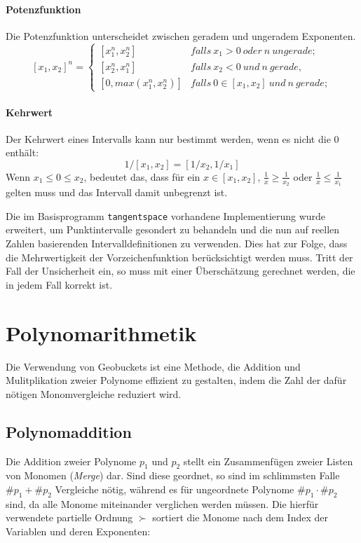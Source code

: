 \paragraph{Potenzfunktion}\label{par:potenzfunktion}
Die Potenzfunktion unterscheidet zwischen geradem und ungeradem Exponenten.
$$[x_1, x_2]^n =
 \begin{cases}
    [x_1^n, x_2^n] & falls\ x_1 > 0\ oder\ n\ ungerade; \\
    [x_2^n, x_1^n] & falls\ x_2 < 0\ und\ n\ gerade, \\
    [0, max(x_1^n, x_2^n)] & falls\ 0\in [x_1, x_2] \ und\ n\ gerade;
 \end{cases}$$

\paragraph{Kehrwert}
Der Kehrwert eines Intervalls kann nur bestimmt werden, wenn es nicht die 0 enthält:
$$
1/[x_1, x_2] = [1/x_2, 1/x_1]
$$
Wenn $x_1 \leq 0\leq x_2$, bedeutet das, dass für ein $x\in [x_1, x_2]$, $\frac{1}{x} \geq \frac{1}{x_2}$ oder $\frac{1}{x} \leq \frac{1}{x_1}$ gelten muss und das Intervall damit unbegrenzt ist.


Die im Basisprogramm \verb+tangentspace+ vorhandene Implementierung wurde erweitert, um Punktintervalle gesondert zu behandeln und die nun auf reellen Zahlen basierenden Intervalldefinitionen zu verwenden. Dies hat zur Folge, dass die Mehrwertigkeit der Vorzeichenfunktion berücksichtigt werden muss. Tritt der Fall der Unsicherheit ein, so muss mit einer Überschätzung gerechnet werden, die in jedem Fall korrekt ist.




\section{Polynomarithmetik}
\label{ch:Implementierung:sec:Abschnitt1}

Die Verwendung von Geobuckets ist eine Methode, die Addition \cite{geobuckets} und Mulitplikation \cite{geobucketsmulti} zweier Polynome effizient zu gestalten, indem die Zahl der dafür nötigen Monomvergleiche reduziert wird.

\subsection{Polynomaddition}
Die Addition zweier Polynome $p_1$ und $p_2$ stellt ein Zusammenfügen zweier Listen von Monomen (\textit{Merge}) dar. Sind diese geordnet, so sind im schlimmsten Falle $\#p_1 +\#p_2$ Vergleiche nötig, während es für ungeordnete Polynome $\#p_1 \cdot \#p_2$ sind, da alle Monome miteinander verglichen werden müssen. Die hierfür verwendete partielle Ordnung $\succ$ sortiert die Monome nach dem Index der Variablen und deren Exponenten:

